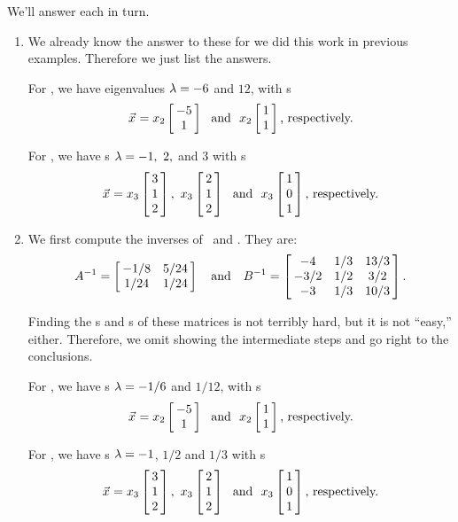 {We'll answer each in turn.

\begin{enumerate}
	\item		We already know the answer to these for we did this work in previous examples. Therefore we just list the answers.
	
	For \tta, we have eigenvalues $\lda = -6$ and  $12$, with \ev s $$\vx = x_2\bmx{c} -5\\1\emx \ \text{ and }\  x_2\bmx{c}1\\1\emx\text{, respectively.}$$

	
	For \ttb, we have \el s $\lda = -1,\ 2,$ and $3$ with \ev s $$\vx = x_3 \bmx{c}3\\1\\2\emx,\ x_3 \bmx{c} 2\\1\\2\emx\ \text{ and }\ x_3 \bmx{c} 1\\0\\1\emx \text{, respectively.} $$
	
	\item		We first compute the inverses of \tta\ and \ttb. They are: 
	$$\ttai = \bmx{cc} -1/8 & 5/24 \\ 1/24 & 1/24 \emx \quad \text{and} \quad
	\ttbi = \bmx{ccc} -4 & 1/3 & 13/3 \\ -3/2 & 1/2 & 3/2 \\ -3 & 1/3 & 10/3 \emx.$$
	
	Finding the \el s and \ev s of these matrices is not terribly hard, but it is not ``easy,'' either. Therefore, we omit showing the intermediate steps and go right to the conclusions. 
	
	For \ttai, we have \el s $\lda = -1/6$ and $1/12$, with \ev s $$\vx = x_2 \bmx{c} -5\\1\emx\ \text{ and }\  x_2 \bmx{c}1\\1\emx\text{, respectively.}$$
	
	For \ttbi, we have \el s $\lda = -1$, $1/2$ and $1/3$ with \ev s $$\vx = x_3\bmx{c} 3\\1\\2\emx,\ x_3\bmx{c} 2\\1\\2\emx \ \text{ and }\  x_3 \bmx{c} 1\\0\\1\emx\text{, respectively.}$$
	
	

\end{enumerate}}

